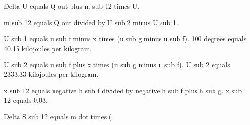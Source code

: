 Delta U equals Q out plus m sub 12 times U.  

m sub 12 equals Q out divided by U sub 2 minus U sub 1.  

U sub 1 equals u sub f minus x times (u sub g minus u sub f).  
100 degrees equals 40.15 kilojoules per kilogram.  

U sub 2 equals u sub f plus x times (u sub g minus u sub f).  
U sub 2 equals 2333.33 kilojoules per kilogram.  

x sub 12 equals negative h sub f divided by negative h sub f plus h sub g.  
x sub 12 equals 0.03.  

Delta S sub 12 equals m dot times (
